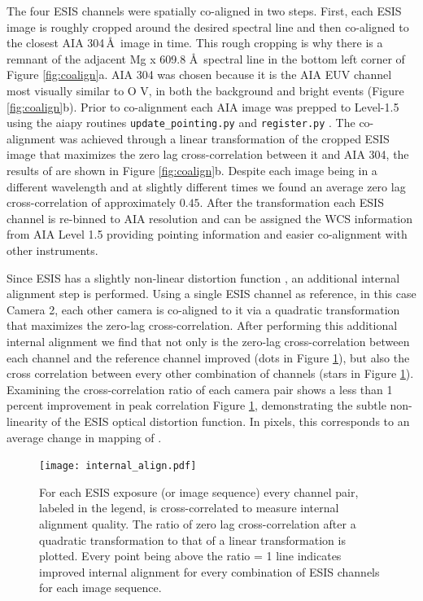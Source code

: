    		The four ESIS channels were spatially co-aligned in two steps.  
   		First, each ESIS image is roughly cropped around the desired spectral line and then co-aligned to the closest AIA 304\,\AA\ image in time.
   		This rough cropping is why there is a remnant of the adjacent Mg {\sc x} 609.8 \AA \ spectral line in the bottom left corner of Figure \ref{fig:coalign}a.
   		AIA 304 was chosen because it is the AIA EUV channel most visually similar to O V, in both the background and bright events (Figure \ref{fig:coalign}b).
   		Prior to co-alignment each AIA image was prepped to Level-1.5 using the aiapy routines \texttt{update\_pointing.py} and \texttt{register.py}  \citep{aiapy}.
   		The co-alignment was achieved through a linear transformation of the cropped ESIS image that maximizes the zero lag cross-correlation between it and AIA 304, the results of are shown in Figure \ref{fig:coalign}b.
   		Despite each image being in a different wavelength and at slightly different times we found an average zero lag cross-correlation of approximately $0.45$.
   		After the transformation each ESIS channel is re-binned to AIA resolution and can be assigned the WCS  information from AIA Level 1.5 providing pointing information and easier co-alignment with other instruments.

    	Since ESIS has a slightly non-linear distortion function \citep{ESIS}, an additional internal alignment step is performed.
    	Using a single ESIS channel as reference, in this case Camera 2, each other camera is co-aligned to it via a quadratic transformation that maximizes the zero-lag cross-correlation. 
    	After performing this additional internal alignment we find that not only is the zero-lag cross-correlation between each channel and the reference channel improved (dots in Figure \ref{fig:cc}), but also the cross correlation between every other combination of channels (stars in Figure \ref{fig:cc}).
    	Examining the cross-correlation ratio of each camera pair shows a less than 1 percent improvement in peak correlation Figure \ref{fig:cc}, demonstrating the subtle non-linearity of the ESIS optical distortion function.
    	In pixels, this corresponds to an average change in mapping of .
    	
     	\begin{figure}[htb!]
    		\centering
    		\texttt{[image: internal\_align.pdf]}
    		\caption{For each ESIS exposure (or image sequence) every channel pair, labeled in the legend, is cross-correlated to measure internal alignment quality.  The ratio of zero lag cross-correlation after a quadratic transformation to that of a linear transformation is plotted.  Every point being above the ratio = 1 line indicates improved internal alignment for every combination of ESIS channels for each image sequence.}
    		\label{fig:cc}	
    	\end{figure}
    	
